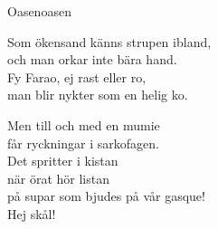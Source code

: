 \begin{song}{Oasen}{oasen}
\begin{vers}
Som ökensand känns strupen ibland,\\
och man orkar inte bära hand.\\
Fy Farao, ej rast eller ro,\\
man blir nykter som en helig ko.\\
\end{vers}
\begin{vers}
\repopen Men till och med en mumie\\
får ryckningar i sarkofagen.\\
Det spritter i kistan\\
när örat hör listan\\
på supar som bjudes på vår gasque! \repclose\\
Hej skål!\\
\end{vers}
\end{song}
